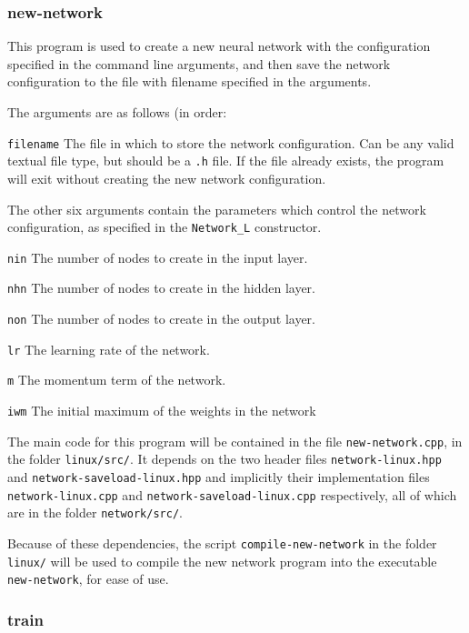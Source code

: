 \documentclass[a4paper]{article}
\begin{document}
\subsubsection{new-network}

This program is used to create a new neural network with the configuration specified in the command line arguments, and then save the network configuration to the file with filename specified in the arguments.

The arguments are as follows (in order:

\lstinline{filename} The file in which to store the network configuration. Can be any valid textual file type, but should be a \lstinline{.h} file. If the file already exists, the program will exit without creating the new network configuration.

The other six arguments contain the parameters which control the network configuration, as specified in the \lstinline{Network_L} constructor.

\lstinline{nin} The number of nodes to create in the input layer.

\lstinline{nhn} The number of nodes to create in the hidden layer.

\lstinline{non} The number of nodes to create in the output layer.

\lstinline{lr} The learning rate of the network.

\lstinline{m} The momentum term of the network.

\lstinline{iwm} The initial maximum of the weights in the network

The main code for this program will be contained in the file \lstinline{new-network.cpp}, in the folder \lstinline{linux/src/}. It depends on the two header files \lstinline{network-linux.hpp} and \lstinline{network-saveload-linux.hpp} and implicitly their implementation files \lstinline{network-linux.cpp} and \lstinline{network-saveload-linux.cpp} respectively, all of which are in the folder \lstinline{network/src/}.


Because of these dependencies, the script \lstinline{compile-new-network} in the folder \lstinline{linux/} will be used to compile the new network program into the executable \lstinline{new-network}, for ease of use.

\subsubsection{train}
\end{document}

